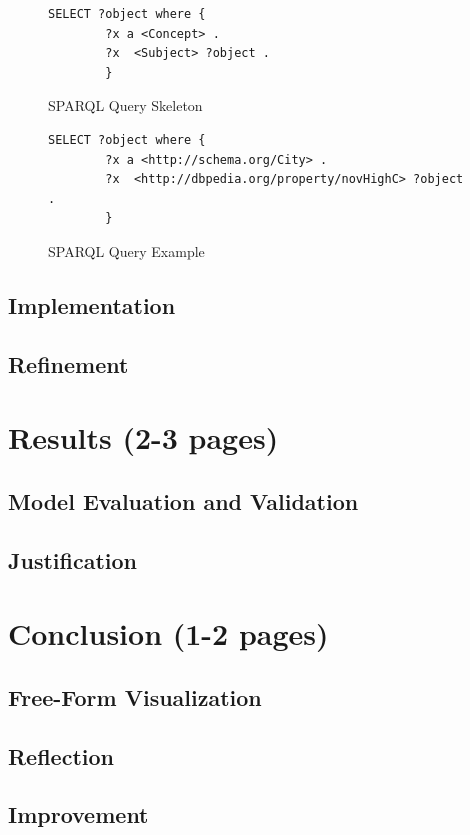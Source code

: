 \documentclass{article}
\begin{document}
\begin{figure}
  \caption{SPARQL Query Skeleton}
  \label{fig:sparql-sk}
\begin{lstlisting}[language=SPARQL]
SELECT ?object where {
        ?x a <Concept> .
        ?x  <Subject> ?object .
        }
\end{lstlisting}
\end{figure}

\begin{figure}
  \caption{SPARQL Query Example}
  \label{fig:sparql-example}
\begin{lstlisting}[language=SPARQL]
SELECT ?object where {
        ?x a <http://schema.org/City> .
        ?x  <http://dbpedia.org/property/novHighC> ?object .
        }
\end{lstlisting}
\end{figure}


\subsection{Implementation}
\subsection{Refinement}


\section{Results (2-3 pages)}
\subsection{Model Evaluation and Validation}
\subsection{Justification}

\section{Conclusion (1-2 pages)}
 \subsection{Free-Form Visualization}
 \subsection{Reflection}
 \subsection{Improvement}
 
\end{document}

